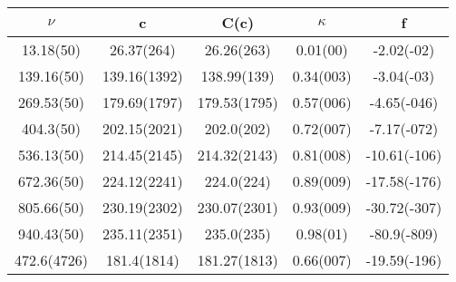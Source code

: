 \begin{table}[H]
	\centering
	\begin{tabular}{ccccc}
		$\nu$ & c & C(c) & $\kappa$ & f\\
		\hline
		13.18(50) & 26.37(264) & 26.26(263) & 0.01(00) & -2.02(-02)	\\
		139.16(50) & 139.16(1392) & 138.99(139) & 0.34(003) & -3.04(-03)	\\
		269.53(50) & 179.69(1797) & 179.53(1795) & 0.57(006) & -4.65(-046)	\\
		404.3(50) & 202.15(2021) & 202.0(202) & 0.72(007) & -7.17(-072)	\\
		536.13(50) & 214.45(2145) & 214.32(2143) & 0.81(008) & -10.61(-106)	\\
		672.36(50) & 224.12(2241) & 224.0(224) & 0.89(009) & -17.58(-176)	\\
		805.66(50) & 230.19(2302) & 230.07(2301) & 0.93(009) & -30.72(-307)	\\
		940.43(50) & 235.11(2351) & 235.0(235) & 0.98(01) & -80.9(-809)	\\
		472.6(4726) & 181.4(1814) & 181.27(1813) & 0.66(007) & -19.59(-196)	\\
	\end{tabular}
\end{table}